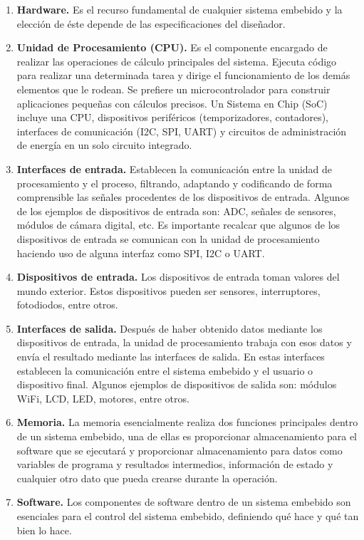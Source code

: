 	\begin{enumerate}
		\item \textbf{Hardware.} Es el recurso fundamental de cualquier sistema embebido y la elección de éste depende de las especificaciones del diseñador.
		
		\item \textbf{Unidad de Procesamiento (CPU).} Es el componente encargado de realizar las operaciones de cálculo principales del sistema. Ejecuta código para realizar una determinada tarea y dirige el funcionamiento de los demás elementos que le rodean. Se prefiere un microcontrolador para construir aplicaciones pequeñas con cálculos precisos. Un Sistema en Chip (SoC) incluye una CPU, dispositivos periféricos (temporizadores, contadores), interfaces de comunicación (I2C, SPI, UART) y circuitos de administración de energía en un solo circuito integrado.
		
		\item \textbf{Interfaces de entrada.} Establecen la comunicación entre la unidad de procesamiento y el proceso, filtrando, adaptando y codificando de forma comprensible las señales procedentes de los dispositivos de entrada. Algunos de los ejemplos de dispositivos de entrada son: ADC, señales de sensores, módulos de cámara digital, etc. Es importante recalcar que algunos de los dispositivos de entrada se comunican con la unidad de procesamiento haciendo uso de alguna interfaz como SPI, I2C o UART.
		
		\item \textbf{Dispositivos de entrada.} Los dispositivos de entrada toman valores del mundo exterior. Estos dispositivos pueden ser sensores, interruptores, fotodiodos, entre otros.
	
		\item \textbf{Interfaces de salida.} Después de haber obtenido datos mediante los dispositivos de entrada, la unidad de procesamiento trabaja con esos datos y envía el resultado mediante las interfaces de salida. En estas interfaces establecen la comunicación entre el sistema embebido y el usuario o dispositivo final. Algunos ejemplos de dispositivos de salida son: módulos WiFi, LCD, LED, motores, entre otros. 
		
		\item \textbf{Memoria.} La memoria esencialmente realiza dos funciones principales dentro de un sistema embebido, una de ellas es proporcionar almacenamiento para el software que se ejecutará y proporcionar almacenamiento para datos como variables de programa y resultados intermedios, información de estado y cualquier otro dato que pueda crearse durante la operación.
		
		\item \textbf{Software.} Los componentes de software dentro de un sistema embebido son esenciales para el control del sistema embebido, definiendo qué hace y qué tan bien lo hace.
	\end{enumerate}
	
